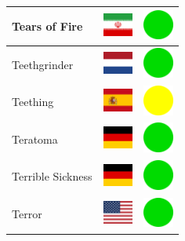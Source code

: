 \documentclass[12pt, a4paper, twoside]{report}
\begin{document}
\begin{center}
\begin{longtable}{|p{5cm}|p{2cm}|p{2cm}|}
 Tears of Fire                                              & \includegraphics[width=1cm]{../4x3/ir} &   \includegraphics[width=1cm]{../likes/y} \\ \hline
 Teethgrinder                                               & \includegraphics[width=1cm]{../4x3/nl} &   \includegraphics[width=1cm]{../likes/y} \\ \hline
 Teething                                                   & \includegraphics[width=1cm]{../4x3/es} &   \includegraphics[width=1cm]{../likes/m} \\ \hline
 Teratoma                                                   & \includegraphics[width=1cm]{../4x3/de} &   \includegraphics[width=1cm]{../likes/y} \\ \hline
 Terrible Sickness                                          & \includegraphics[width=1cm]{../4x3/de} &   \includegraphics[width=1cm]{../likes/y} \\ \hline
 Terror                                                     & \includegraphics[width=1cm]{../4x3/us} &   \includegraphics[width=1cm]{../likes/y} \\ \hline

\end{longtable}
\end{center}
\end{document}
